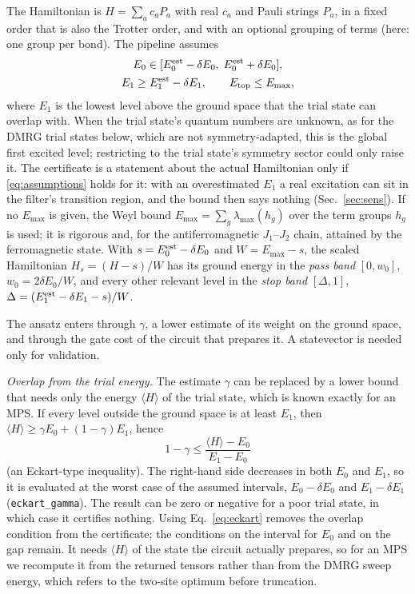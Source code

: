 \documentclass[aps,pra,twocolumn,superscriptaddress,nofootinbib]{revtex4-2}
\begin{document}
The Hamiltonian is $H=\sum_a c_aP_a$ with real $c_a$ and Pauli strings $P_a$, in a fixed order that is
also the Trotter order, and with an optional grouping of terms (here: one group per bond). The pipeline
assumes
\begin{equation}
\begin{gathered}
E_0\in[E_0^{\rm est}-\delta E_0,\;E_0^{\rm est}+\delta E_0],\\
E_1\ge E_1^{\rm est}-\delta E_1,\qquad E_{\rm top}\le E_{\max},
\end{gathered}
\label{eq:assumptions}
\end{equation}
where $E_1$ is the lowest level above the ground space that the trial state can overlap with. When the
trial state's quantum numbers are unknown, as for the DMRG trial states below, which are not
symmetry-adapted, this is the global first excited level; restricting to the trial state's symmetry
sector could only raise it. The certificate is a statement about the actual Hamiltonian only if
\eqref{eq:assumptions} holds for it: with an overestimated $E_1$ a real excitation can sit in the
filter's transition region, and the bound then says nothing (Sec.~\ref{sec:sens}). If no
$E_{\max}$ is given, the Weyl bound $E_{\max}=\sum_g\lambda_{\max}(h_g)$ over the term groups $h_g$ is
used; it is rigorous and, for the antiferromagnetic $J_1$--$J_2$ chain, attained by the ferromagnetic
state. With $s=E_0^{\rm est}-\delta E_0$ and $W=E_{\max}-s$, the scaled Hamiltonian $H_s=(H-s)/W$ has its
ground energy in the \emph{pass band} $[0,w_0]$, $w_0=2\delta E_0/W$, and every other relevant level in
the \emph{stop band} $[\Delta,1]$, $\Delta=(E_1^{\rm est}-\delta E_1-s)/W$.

The ansatz enters through $\gamma$, a lower estimate of its weight on the ground space, and through the
gate cost of the circuit that prepares it. A statevector is needed only for validation.

\emph{Overlap from the trial energy.} The estimate $\gamma$ can be replaced by a lower bound that needs
only the energy $\langle H\rangle$ of the trial state, which is known exactly for an MPS. If every level
outside the ground space is at least $E_1$, then $\langle H\rangle\ge\gamma E_0+(1-\gamma)E_1$, hence
\begin{equation}
1-\gamma\le\frac{\langle H\rangle-E_0}{E_1-E_0}
\label{eq:eckart}
\end{equation}
(an Eckart-type inequality). The right-hand side decreases in both $E_0$ and $E_1$, so it is evaluated at
the worst case of the assumed intervals, $E_0-\delta E_0$ and $E_1-\delta E_1$ (\texttt{eckart\_gamma}). The
result can be zero or negative for a poor trial state, in which case it certifies nothing. Using
Eq.~\eqref{eq:eckart} removes the overlap condition from the certificate; the conditions on the interval for
$E_0$ and on the gap remain. It needs $\langle H\rangle$ of the state the circuit actually prepares, so for
an MPS we recompute it from the returned tensors rather than from the DMRG sweep energy, which refers to the
two-site optimum before truncation.
\end{document}
